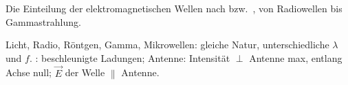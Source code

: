 \begin{runintext}
Die Einteilung der elektromagnetischen Wellen nach  bzw.\ , von Radiowellen bis Gammastrahlung.
\end{runintext}
\begin{runintext}
Licht, Radio, Röntgen, Gamma, Mikrowellen: gleiche Natur, unterschiedliche $\lambda$ und $f$. : beschleunigte Ladungen; Antenne: Intensität $\perp$ Antenne max, entlang Achse null; $\vec{E}$ der Welle $\parallel$ Antenne.
\end{runintext}

